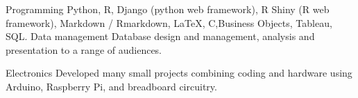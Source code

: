 


\begin{cvskills}

  \cvskill
    {Programming} %
    {Python, R, Django (python web framework), R Shiny (R web framework), Markdown / Rmarkdown, LaTeX, C,\newline Business Objects, Tableau, SQL.} %
  \cvskill
    {Data management}
    {Database design and management, analysis and presentation to a range of audiences.}
    
   \cvskill
     {Electronics}
     {Developed many small projects combining coding and hardware using Arduino, Raspberry Pi, and breadboard circuitry.}
    
\end{cvskills}